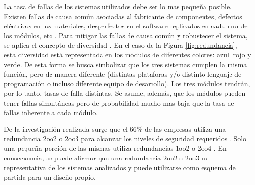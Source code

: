	La tasa de fallas de los sistemas utilizados debe ser lo mas pequeña posible. Existen fallas de causa común asociadas al fabricante de componentes, defectos eléctricos en los materiales, desperfectos en el software replicados en cada uno de los módulos, etc \cite{Paper_30,Paper_32,Paper_42,Paper_47,Paper_77,Paper_83,Paper_84,Paper_118,Paper_122,Paper_124,Paper_125,Paper_127,Paper_131,Paper_132,Paper_136,Paper_138,Paper_140}. Para mitigar las fallas de causa común y robustecer el sistema, se aplica el concepto de diversidad \cite{Paper_53,Paper_125,Paper_131,Paper_132,Paper_140,Paper_171}. En el caso de la Figura \ref{fig:redundancia}, esta diversidad está representada en los módulos de diferentes colores: azul, rojo y verde. De esta forma se busca simbolizar que los tres sistemas cumplen la misma función, pero de manera diferente (distintas plataforas y/o distinto lenguaje de programación o incluso diferente equipo de desarrollo). Los tres módulos tendrán, por lo tanto, tasas de falla distintas. Se asume, además, que los módulos pueden tener fallas simultáneas pero de probabilidad mucho mas baja que la tasa de fallas inherente a cada módulo.
	
	De la investigación realizada surge que el 66\% de las empresas utiliza una redundancia 2oo2 o 2oo3 para alcanzar los niveles de seguridad requeridos \cite{SIEMENS,ALSTOM,HITACHI,THALES,BOMBARDIER,KYOSAN,HIMA,CRRC,CAF,TRANSMASHHOLDING,HYUNDAI,GENERAL,CATERPILLAR,STADLER}. Solo una pequeña porción de las mismas utiliza redundancias 1oo2 \cite{ALSTOM} o 2oo4 \cite{HITACHI}. En consecuencia, se puede afirmar que una redundancia 2oo2 o 2oo3 es representativa de los sistemas analizados y puede utilizarse como esquema de partida para un diseño propio.